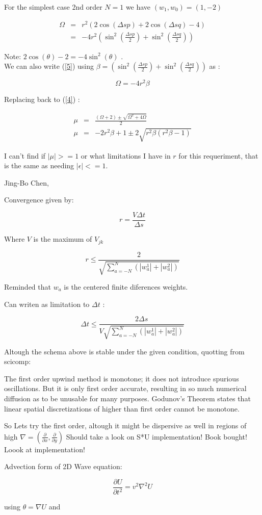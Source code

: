 \documentclass[legalpaper, 12pt]{article}
\begin{document}
For the simplest case 2nd order $ N=1 $ we have $ (w_1, w_0) = (1, -2) $

\begin{eqnarray}
\Omega	&=& r^2 \left( 2\cos(\Delta s p) + 2\cos(\Delta s q) - 4\right) \nonumber \\
	&=& -4r^2 \left( \sin^2(\frac{\Delta s p}{2}) + \sin^2(\frac{\Delta s q}{2}) \right) \label{5}
\end{eqnarray}

Note:  $ 2 \cos(\theta) - 2 = -4 \sin ^2 (\theta) $ .\\

We can also write (\ref{5}) using $ \beta = \left( \sin^2(\frac{\Delta s p}{2}) + \sin^2(\frac{\Delta s q}{2}) \right) $ as :

$$ \Omega = -4r^2\beta $$

Replacing back to (\ref{4}) :

\begin{eqnarray}
\mu &=& \frac{(\Omega+2) \pm \sqrt{\Omega^2 + 4\Omega}}{2} \nonumber \\
\mu &=& -2r^2\beta+1 \pm 2\sqrt{r^2\beta(r^2\beta-1)} \nonumber
\end{eqnarray}

I can't find if $ | \mu | >= 1 $ or what limitations I have in $r$ for this requeriment, that is the same as needing $ | \epsilon | <= 1  $. 
\newpage


Jing-Bo Chen, \\
\bigskip

Convergence given by:

$$ r = \frac{V \Delta t}{\Delta s} $$ 

Where $ V $ is the maximum of $ V_{jk} $ 

$$ r \leq \frac{2}{\sqrt{\sum_{a=-N}^{N} (|w_a^1| + |w_a^2|)}} $$

Reminded that $w_a$ is the centered finite diferences weights. 

Can writen as limitation to $ \Delta t $ :

$$ \Delta t \leq \frac{2 \Delta s}{ V \sqrt{\sum_{a=-N}^{N} (|w_a^1| + |w_a^2|)}} $$

\newpage

Altough the schema above is stable under the given condition, quotting from scicomp:

The first order upwind method is monotone; it does not introduce spurious oscillations. But it is only first order accurate, resulting in so much numerical diffusion as to be unusable for many purposes. Godunov's Theorem states that linear spatial discretizations of higher than first order cannot be monotone.

So Lets try the first order, altough it might be dispersive as well in regions of high $ \nabla = ( \frac{\partial}{\partial x}, \frac{\partial}{\partial y} ) $ Should take a look on S*U implementation! Book bought! Loook at implementation!

\medspace
\medspace
Advection form of 2D Wave equation:
\medspace

$$ \frac{\partial U}{\partial t ^2} = v^2 \nabla^2 U $$ 

using $\theta = \nabla U $ and 
\end{document}
